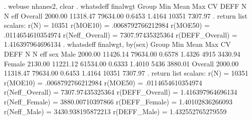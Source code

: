 . webuse nhanes2, clear
{\smallskip}
. whatsdeff finalwgt
{\smallskip}
    Group     {\VBAR}   Min     {\VBAR}   Mean    {\VBAR}   Max     {\VBAR}    CV   {\VBAR}   DEFF  {\VBAR}   N   {\VBAR}  N eff
      Overall {\VBAR}   2000.00 {\VBAR}  11318.47 {\VBAR}  79634.00 {\VBAR}  0.6453 {\VBAR}  1.4164 {\VBAR} 10351 {\VBAR} 7307.97
{\smallskip}
. return list
{\smallskip}
scalars:
                  r(N) =  10351
              r(MOE10) =  .0068792766212984
              r(MOE50) =  .0114654610354974
       r(Neff_Overall) =  7307.97435325364
       r(DEFF_Overall) =  1.416397964696134
{\smallskip}
. whatsdeff finalwgt, by(sex)
{\smallskip}
    Group     {\VBAR}   Min     {\VBAR}   Mean    {\VBAR}   Max     {\VBAR}    CV   {\VBAR}   DEFF  {\VBAR}   N   {\VBAR}  N eff
sex           {\VBAR}           {\VBAR}           {\VBAR}           {\VBAR}         {\VBAR}         {\VBAR}       {\VBAR}
         Male {\VBAR}   2000.00 {\VBAR}  11426.14 {\VBAR}  79634.00 {\VBAR}  0.6578 {\VBAR}  1.4326 {\VBAR}  4915 {\VBAR} 3430.94
       Female {\VBAR}   2130.00 {\VBAR}  11221.12 {\VBAR}  61534.00 {\VBAR}  0.6333 {\VBAR}  1.4010 {\VBAR}  5436 {\VBAR} 3880.01
      Overall {\VBAR}   2000.00 {\VBAR}  11318.47 {\VBAR}  79634.00 {\VBAR}  0.6453 {\VBAR}  1.4164 {\VBAR} 10351 {\VBAR} 7307.97
{\smallskip}
. return list
{\smallskip}
scalars:
                  r(N) =  10351
              r(MOE10) =  .0068792766212984
              r(MOE50) =  .0114654610354974
       r(Neff_Overall) =  7307.97435325364
       r(DEFF_Overall) =  1.416397964696134
        r(Neff_Female) =  3880.00710397866
        r(DEFF_Female) =  1.40102836266093
          r(Neff_Male) =  3430.938195872213
          r(DEFF_Male) =  1.432552765279559
{\smallskip}
